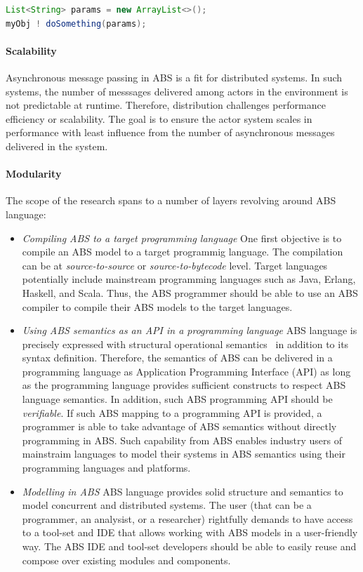 \begin{lstlisting}[float=h,language=Java,caption=Using Java in ABS,label=lst:abs:java]
List<String> params = new ArrayList<>();
myObj ! doSomething(params);   
\end{lstlisting}

\paragraph{Scalability} 
Asynchronous message passing in ABS is a fit for distributed systems.
In such systems, the number of messsages delivered among actors in the 
environment is not predictable at runtime.
Therefore, distribution challenges performance efficiency or scalability.
The goal is to ensure the actor system scales in performance with least 
influence from the number of asynchronous messages delivered in the system.

\paragraph{Modularity} 
The scope of the research spans to a number of layers revolving around ABS
 language:
\begin{itemize}
\item \emph{Compiling ABS to a target programming language}
One first objective is to compile an ABS model to a target programmig language.
The compilation can be at \emph{source-to-source} or \emph{source-to-bytecode}
level.
Target languages potentially include mainstream programming languages such as
Java, Erlang, Haskell, and Scala.
Thus, the ABS programmer should be able to use an ABS compiler to compile
their ABS models to the target languages.
\item \emph{Using ABS semantics as an API in a programming language}
ABS language is precisely expressed with structural operational semantics~\cite{johnsen2012abs} in addition to its syntax definition.
Therefore, the semantics of ABS can be delivered in a programming language
as Application Programming Interface (API) as long as the programming language provides sufficient constructs to respect ABS language semantics.
In addition, such ABS programming API should be \emph{verifiable}.
If such ABS mapping to a programming API is provided, a programmer is able to
take advantage of ABS semantics without directly programming in ABS.
Such capability from ABS enables industry users of mainstraim languages to
model their systems in ABS semantics using their programming languages and
platforms.
\item \emph{Modelling in ABS}
ABS language provides solid structure and semantics to model concurrent
and distributed systems.
The user (that can be a programmer, an analysist, or a researcher) rightfully
demands to have access to a tool-set and IDE that allows working with ABS 
models in a user-friendly way.
The ABS IDE and tool-set developers should be able to easily reuse and compose
over existing modules and components.
\end{itemize}

